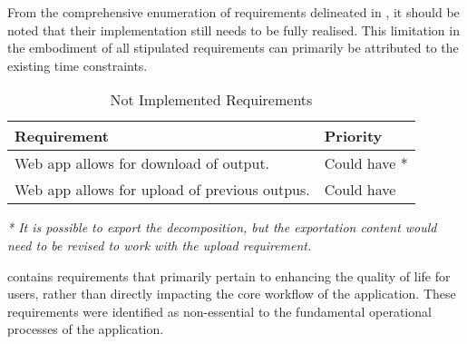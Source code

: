 From the comprehensive enumeration of requirements delineated in
, it should
be noted that their implementation still needs to be fully realised. This
limitation in the embodiment of all stipulated requirements can primarily be
attributed to the existing time constraints.

\begin{table}[!htb] \caption{Not Implemented Requirements} \label{tab:not-implemented-requirements}
  \begin{center}
    \begin{tabular}[c]{p{16em}|p{8em}}
      \textbf{Requirement} &
      \textbf{Priority} \\
      \hline Web app allows for download of output. & {Could have *} \\
      \hline Web app allows for upload of previous outpus. & {Could have} \\
    \end{tabular}
  \end{center}
 \vspace{1ex}
 {\raggedright \textit{* It is possible to export the decomposition, but the exportation content would need to be revised to work with the upload requirement.} \par}
\end{table}

 contains requirements that primarily
pertain to enhancing the quality of life for users, rather than directly
impacting the core workflow of the application. These requirements were
identified as non-essential to the fundamental operational processes of the
application.
